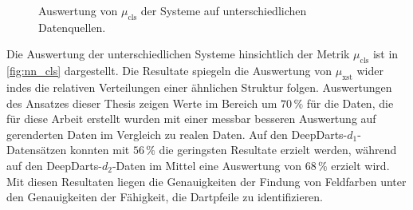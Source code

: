 \begin{figure}
    \centering
    \caption{Auswertung von $\mu_\text{cls}$ der Systeme auf unterschiedlichen Datenquellen.}
    \label{fig:nn_cls}
\end{figure}

Die Auswertung der unterschiedlichen Systeme hinsichtlich der Metrik $\mu_\text{cls}$ ist in \autoref{fig:nn_cls} dargestellt. Die Resultate spiegeln die Auswertung von $\mu_\text{xst}$ wider indes die relativen Verteilungen einer ähnlichen Struktur folgen. Auswertungen des Ansatzes dieser Thesis zeigen Werte im Bereich um $70\,\%$ für die Daten, die für diese Arbeit erstellt wurden mit einer messbar besseren Auswertung auf gerenderten Daten im Vergleich zu realen Daten. Auf den DeepDarts-$d_1$-Datensätzen konnten mit $56\,\%$ die geringsten Resultate erzielt werden, während auf den DeepDarts-$d_2$-Daten im Mittel eine Auswertung von $68\,\%$ erzielt wird. Mit diesen Resultaten liegen die Genauigkeiten der Findung von Feldfarben unter den Genauigkeiten der Fähigkeit, die Dartpfeile zu identifizieren.

